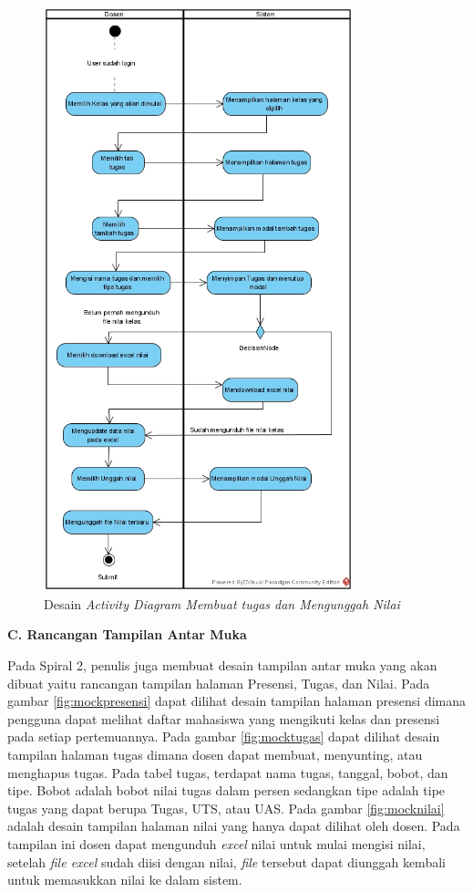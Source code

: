 \begin{figure}[H]
	\centering
	\includegraphics[width=0.8\textwidth]{gambar/diagram/Membuat tugas dan Mengunggah Nilai}
	\caption{Desain \textit{Activity Diagram Membuat tugas dan Mengunggah Nilai}}
	\label{fig:acttugasnilai}
\end{figure}


\textbf{C. Rancangan Tampilan Antar Muka}

	Pada Spiral 2, penulis juga membuat desain tampilan antar muka yang akan dibuat yaitu rancangan tampilan halaman Presensi, Tugas, dan Nilai. Pada gambar \ref{fig:mockpresensi} dapat dilihat desain tampilan halaman presensi dimana pengguna dapat melihat daftar mahasiswa yang mengikuti kelas dan presensi pada setiap pertemuannya. Pada gambar \ref{fig:mocktugas} dapat dilihat desain tampilan halaman tugas dimana dosen dapat membuat, menyunting, atau menghapus tugas. Pada tabel tugas, terdapat nama tugas, tanggal,  bobot, dan tipe. Bobot adalah bobot nilai tugas dalam persen sedangkan tipe adalah tipe tugas yang dapat berupa Tugas, UTS, atau UAS. Pada gambar \ref{fig:mocknilai} adalah desain tampilan halaman nilai yang hanya dapat dilihat oleh dosen. Pada tampilan ini dosen dapat mengunduh \textit{excel} nilai untuk mulai mengisi nilai, setelah \textit{file excel} sudah diisi dengan nilai, \textit{file} tersebut dapat diunggah kembali untuk memasukkan nilai ke dalam sistem.

